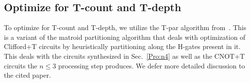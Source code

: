 \subsection{Optimize for T-count and T-depth}
\label{Pro:Tpar}

To optimize for T-count and T-depth, we utilize the T-par algorithm from~\cite{bib-amy-matroid}. This is a
variant of the matroid partitioning algorithm that deals with optimization of Clifford+T circuits by heuristically
partitioning along the H-gates present in it. This deals with the circuits synthesized in Sec.~\ref{Pro:n4} as well
as the CNOT+T circuits the $n \leq 3$ processing step produces. We defer more detailed discussion to the cited
paper.



